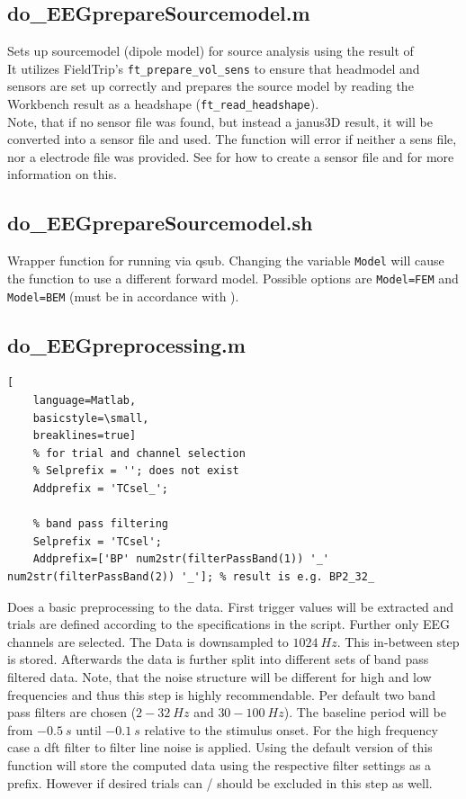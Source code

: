 \documentclass[12pt,a4paper]{scrartcl}
\begin{document}
\subsection{do\_EEGprepareSourcemodel.m}
\label{m:prepSM}
Sets up sourcemodel (dipole model) for source analysis using the result of \texttt{}\\
\noindent It utilizes FieldTrip's \texttt{ft\_prepare\_vol\_sens} to ensure that headmodel and sensors are set up correctly and prepares the source model by reading the Workbench result as a headshape (\texttt{ft\_read\_headshape}).\\

\noindent Note, that if no sensor file was found, but instead a janus3D result, it will be converted into a sensor file and used. The function will error if neither a sens file, nor a electrode file was provided. See  for how to create a sensor file and  for more information on this.

\subsection{do\_EEGprepareSourcemodel.sh}
\label{sh:prepSM}
Wrapper function for running \texttt{} via qsub. Changing the variable \texttt{Model} will cause the function to use a different forward model. Possible options are \texttt{Model=FEM} and \texttt{Model=BEM} (must be in accordance with \texttt{}).\\

\subsection{do\_EEGpreprocessing.m}
\label{m:EEGpreproc}
\begin{lstlisting}[
    language=Matlab,
    basicstyle=\small,
    breaklines=true]
    % for trial and channel selection
    % Selprefix = ''; does not exist
    Addprefix = 'TCsel_';

    % band pass filtering
    Selprefix = 'TCsel';
    Addprefix=['BP' num2str(filterPassBand(1)) '_' num2str(filterPassBand(2)) '_']; % result is e.g. BP2_32_
\end{lstlisting}
Does a basic preprocessing to the data. First trigger values will be extracted and trials are defined according to the specifications in the script. Further only EEG channels are selected. The Data is downsampled to $1024~Hz$. This in-between step is stored. Afterwards the data is further split into different sets of band pass filtered data. Note, that the noise structure will be different for high and low frequencies and thus this step is highly recommendable. Per default two band pass filters are chosen ($2-32~Hz$ and $30-100~Hz$). The baseline period will be from $-0.5~s$ until $-0.1~s$ relative to the stimulus onset. For the high frequency case a dft filter to filter line noise is applied. Using the default version of this function will store the computed data using the respective filter settings as a prefix. However if desired trials can / should be excluded in this step as well.\\
\end{document}
